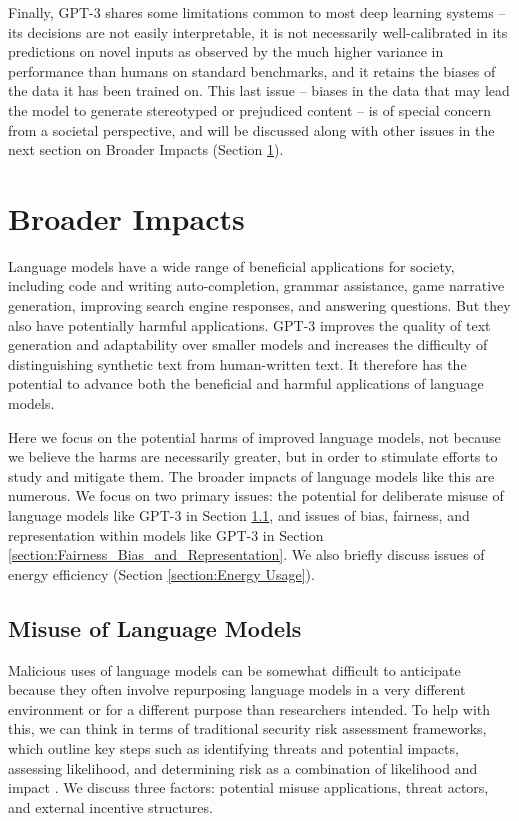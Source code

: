 \documentclass{article}
\begin{document}
Finally, GPT-3 shares some limitations common to most deep learning systems -- its decisions are not easily interpretable, it is not necessarily well-calibrated in its predictions on novel inputs as observed by the much higher variance in performance than humans on standard benchmarks, and it retains the biases of the data it has been trained on.  This last issue -- biases in the data that may lead the model to generate stereotyped or prejudiced content -- is of special concern from a societal perspective, and will be discussed along with other issues in the next section on Broader Impacts (Section \ref{section:Broader_Impacts}).

 \section{Broader Impacts}
\label{section:Broader_Impacts}
Language models have a wide range of beneficial applications for society,  including code and writing auto-completion, grammar assistance, game narrative generation, improving search engine responses, and answering questions. But they also have potentially harmful applications. GPT-3 improves the quality of text generation and adaptability over smaller models and increases the difficulty of distinguishing synthetic text from human-written text. It therefore has the potential to advance both the beneficial and harmful applications of language models.

Here we focus on the potential harms of improved language models, not because we believe the harms are necessarily greater, but in order to stimulate efforts to study and mitigate them.  The broader impacts of language models like this are numerous. We focus on two primary issues: the potential for deliberate misuse of language models like GPT-3 in Section \ref{section:misuse_of_language_models}, and issues of bias, fairness, and representation within models like GPT-3 in Section \ref{section:Fairness_Bias_and_Representation}.  We also briefly discuss issues of energy efficiency (Section \ref{section:Energy Usage}).
 
 
    \subsection{Misuse of Language Models}
    \label{section:misuse_of_language_models}
    Malicious uses of language models can be somewhat difficult to anticipate because they often involve repurposing language models in a very different environment or for a different purpose than researchers intended. To help with this, we can think in terms of traditional security risk assessment frameworks, which outline key steps such as identifying threats and potential impacts, assessing likelihood, and determining risk as a combination of likelihood and impact \cite{ross2012risk}.  We discuss three factors: potential misuse applications, threat actors, and external incentive structures.  
\end{document}
